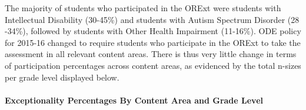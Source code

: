 \documentclass[]{article}
\let\oldparagraph\paragraph
\renewcommand{\paragraph}[1]{\oldparagraph{#1}\mbox{}}
\begin{document}
The majority of students who participated in the ORExt were students
with Intellectual Disability (30-45\%) and students with Autism Spectrum
Disorder (28 -34\%), followed by students with Other Health Impairment
(11-16\%). ODE policy for 2015-16 changed to require students who
participate in the ORExt to take the assessment in all relevant content
areas. There is thus very little change in terms of participation
percentages across content areas, as evidenced by the total n-sizes per
grade level displayed below.

\clearpage

\paragraph{Exceptionality Percentages By Content Area and Grade
Level}\label{exceptionality-percentages-by-content-area-and-grade-level}
\end{document}
